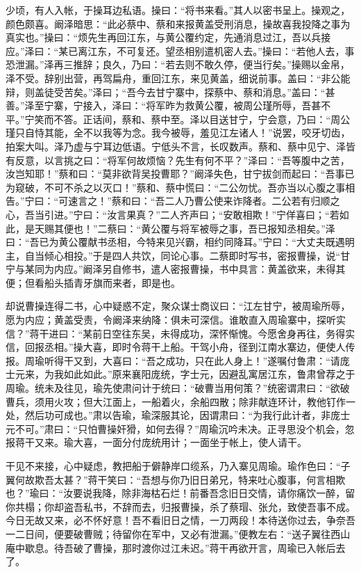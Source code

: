 少顷，有人入帐，于操耳边私语。操曰：“将书来看。”其人以密书呈上。操观之，颜色颇喜。阚泽暗思：“此必蔡中、蔡和来报黄盖受刑消息，操故喜我投降之事为真实也。”操曰：“烦先生再回江东，与黄公覆约定，先通消息过江，吾以兵接应。”泽曰：“某已离江东，不可复还。望丞相别遣机密人去。”操曰：“若他人去，事恐泄漏。”泽再三推辞；良久，乃曰：“若去则不敢久停，便当行矣。”操赐以金帛，泽不受。辞别出营，再驾扁舟，重回江东，来见黄盖，细说前事。盖曰：“非公能辩，则盖徒受苦矣。”泽曰；“吾今去甘宁寨中，探蔡中、蔡和消息。”盖曰：“甚善。”泽至宁寨，宁接入，泽曰：“将军昨为救黄公覆，被周公瑾所辱，吾甚不平。”宁笑而不答。正话间，蔡和、蔡中至。泽以目送甘宁，宁会意，乃曰：“周公瑾只自恃其能，全不以我等为念。我今被辱，羞见江左诸人！”说罢，咬牙切齿，拍案大叫。泽乃虚与宁耳边低语。宁低头不言，长叹数声。蔡和、蔡中见宁、泽皆有反意，以言挑之曰：“将军何故烦恼？先生有何不平？”泽曰：“吾等腹中之苦，汝岂知耶！”蔡和曰：“莫非欲背吴投曹耶？”阚泽失色，甘宁拔剑而起曰：“吾事已为窥破，不可不杀之以灭口！”蔡和、蔡中慌曰：“二公勿忧。吾亦当以心腹之事相告。”宁曰：“可速言之！”蔡和曰：“吾二人乃曹公使来诈降者。二公若有归顺之心，吾当引进。”宁曰：“汝言果真？”二人齐声曰；“安敢相欺！”宁佯喜曰；“若如此，是天赐其便也！”二蔡曰：“黄公覆与将军被辱之事，吾已报知丞相矣。”泽曰：“吾已为黄公覆献书丞相，今特来见兴霸，相约同降耳。”宁曰：“大丈夫既遇明主，自当倾心相投。”于是四人共饮，同论心事。二蔡即时写书，密报曹操，说“甘宁与某同为内应。”阚泽另自修书，遣人密报曹操，书中具言：黄盖欲来，未得其便；但看船头插青牙旗而来者，即是也。

却说曹操连得二书，心中疑惑不定，聚众谋士商议曰：“江左甘宁，被周瑜所辱，愿为内应；黄盖受责，令阚泽来纳降：俱未可深信。谁敢直入周瑜寨中，探听实信？”蒋干进曰：“某前日空往东吴，未得成功，深怀惭愧。今愿舍身再往，务得实信，回报丞相。”操大喜，即时令蒋干上船。干驾小舟，径到江南水寨边，便使人传报。周瑜听得干又到，大喜曰：“吾之成功，只在此人身上！”遂嘱付鲁肃：“请庞士元来，为我如此如此。”原来襄阳庞统，字士元，因避乱寓居江东，鲁肃曾荐之于周瑜。统未及往见，瑜先使肃问计于统曰：“破曹当用何策？”统密谓肃曰：“欲破曹兵，须用火攻；但大江面上，一船着火，余船四散；除非献连环计，教他钉作一处，然后功可成也。”肃以告瑜，瑜深服其论，因谓肃曰：“为我行此计者，非庞士元不可。”肃曰：“只怕曹操奸猾，如何去得？”周瑜沉吟未决。正寻思没个机会，忽报蒋干又来。瑜大喜，一面分付庞统用计；一面坐于帐上，使人请干。

干见不来接，心中疑虑，教把船于僻静岸口缆系，乃入寨见周瑜。瑜作色曰：“子翼何故欺吾太甚？”蒋干笑曰：“吾想与你乃旧日弟兄，特来吐心腹事，何言相欺也？”瑜曰：“汝要说我降，除非海枯石烂！前番吾念旧日交情，请你痛饮一醉，留你共榻；你却盗吾私书，不辞而去，归报曹操，杀了蔡瑁、张允，致使吾事不成。今日无故又来，必不怀好意！吾不看旧日之情，一刀两段！本待送你过去，争奈吾一二日间，便要破曹贼；待留你在军中，又必有泄漏。”便教左右：“送子翼往西山庵中歇息。待吾破了曹操，那时渡你过江未迟。”蒋干再欲开言，周瑜已入帐后去了。

